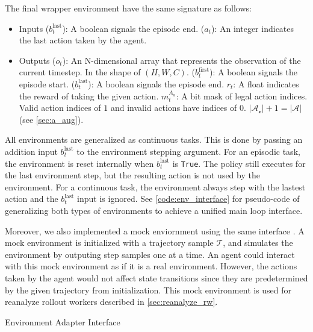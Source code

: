 \documentclass[12pt]{article}
\newcommand{\includecode}[2]{
\begin{listing}[H]
    \caption{#2}
    \label{code:#1}
    \inputminted[frame=single, framesep=10pt, fontsize=\footnotesize]{python}{src/#1.py}
\end{listing}   
}
\begin{document}
The final wrapper environment have the same signature as follows:
\begin{itemize}
    \item Inputs
          \subitem ($b^{\text{last}}_{t}$): A boolean signals the episode end.
          \subitem ($a_t$): An integer indicates the last action taken by the agent.
    \item Outputs
          \subitem ($o_t$):
          An N-dimensional array that represents the observation of the current timestep.
          In the shape of $(H, W, C)$.
          \subitem ($b^{\text{first}}_{t}$): A boolean signals the episode start.
          \subitem ($b^{\text{last}}_{t}$): A boolean signals the episode end.
          \subitem $r_t$: A float indicates the reward of taking the given action.
          \subitem $m^{A_a}_t$: A bit mask of legal action indices. Valid
          action indices of $1$ and invalid actions have indices of $0$.
          $ | \mathcal{A_e} | + 1 = | \mathcal{A} | $ (see \ref{sec:a_aug}).
\end{itemize}

All environments are generalized as continuous tasks.
This is done by passing an addition input $b^\text{last}_t$ to the environment stepping argument.
For an episodic task, the environment is reset internally when $b^{\text{last}}_t$ is \Verb|True|.
The policy still executes for the last environment step, but the resulting action is not used by the environment.
For a continuous task, the environment always step with the lastest action and the $b^{\text{last}}_t$ input is ignored.
See \ref{code:env_interface} for pseudo-code of generalizing both types of environments to achieve a unified main loop interface.

Moreover, we also implemented a mock enviornment using the same interface \cite{MockObject__2021}.
A mock environment is initialized with a trajectory sample $\mathcal{T}$, and simulates the environment by outputing step samples one at a time.
An agent could interact with this mock environment as if it is a real environment.
However, the actions taken by the agent would not affect state transitions since they are predetermined by the given trajectory from initialization.
This mock environment is used for reanalyze rollout workers described in \ref{sec:reanalyze_rw}.

\includecode{env_interface}{Environment Adapter Interface}
\end{document}
